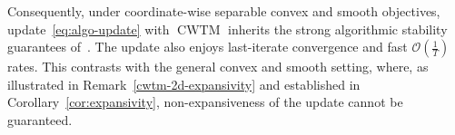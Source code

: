 \documentclass[twoside,11pt]{article}
\begin{document}
Consequently, under coordinate-wise separable convex and smooth objectives, update~\eqref{eq:algo-update} with $\operatorname{CWTM}$ inherits the strong algorithmic stability guarantees of~\citet{hardt2016train}.
The update also enjoys last-iterate convergence and fast $\mathcal{O}(\frac{1}{T})$ rates.
This contrasts with the general convex and smooth setting, where, as illustrated in Remark~\ref{cwtm-2d-expansivity} and established in Corollary~\ref{cor:expansivity}, non-expansiveness of the update cannot be guaranteed.
\end{document}
